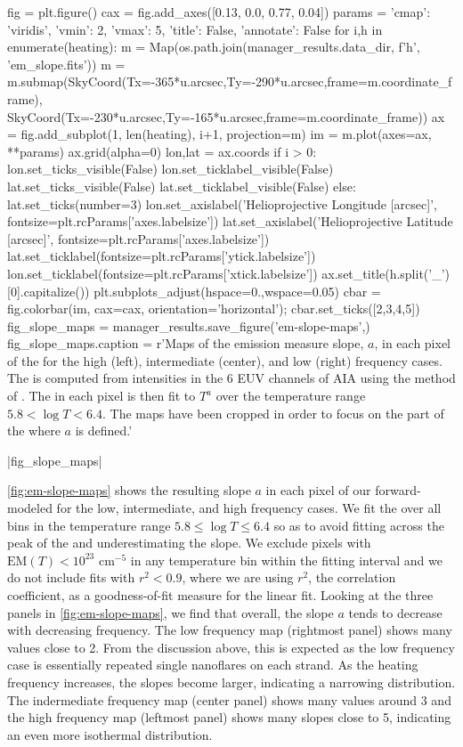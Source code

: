 \begin{pycode}
fig = plt.figure()
cax = fig.add_axes([0.13, 0.0, 0.77, 0.04])
params = {'cmap': 'viridis', 'vmin': 2, 'vmax': 5, 'title': False, 'annotate': False}
for i,h in enumerate(heating):
    m = Map(os.path.join(manager_results.data_dir, f'{h}', 'em_slope.fits'))
    m = m.submap(SkyCoord(Tx=-365*u.arcsec,Ty=-290*u.arcsec,frame=m.coordinate_frame),
                 SkyCoord(Tx=-230*u.arcsec,Ty=-165*u.arcsec,frame=m.coordinate_frame))
    ax = fig.add_subplot(1, len(heating), i+1, projection=m)
    im = m.plot(axes=ax, **params)
    ax.grid(alpha=0)
    lon,lat = ax.coords
    if i > 0:
        lon.set_ticks_visible(False)
        lon.set_ticklabel_visible(False)
        lat.set_ticks_visible(False)
        lat.set_ticklabel_visible(False)
    else:
        lat.set_ticks(number=3)
        lon.set_axislabel('Helioprojective Longitude [arcsec]',
                          fontsize=plt.rcParams['axes.labelsize'])
        lat.set_axislabel('Helioprojective Latitude [arcsec]',
                          fontsize=plt.rcParams['axes.labelsize'])
        lat.set_ticklabel(fontsize=plt.rcParams['ytick.labelsize'])
        lon.set_ticklabel(fontsize=plt.rcParams['xtick.labelsize'])
    ax.set_title(h.split('_')[0].capitalize())
plt.subplots_adjust(hspace=0.,wspace=0.05)
cbar = fig.colorbar(im, cax=cax, orientation='horizontal');
cbar.set_ticks([2,3,4,5])
fig_slope_maps = manager_results.save_figure('em-slope-maps',)
fig_slope_maps.caption = r'Maps of the emission measure slope, $a$, in each pixel of the \AR{} for the high (left), intermediate (center), and low (right) frequency cases. The \dem{} is computed from intensities in the 6 EUV channels of AIA using the method of \citet{hannah_differential_2012}. The \dem{} in each pixel is then fit to $T^a$ over the temperature range $5.8<\log{T}<6.4$. The maps have been cropped in order to focus on the part of the \AR{} where $a$ is defined.'  
\end{pycode}
|fig_slope_maps|

\autoref{fig:em-slope-maps} shows the resulting \dem{} slope $a$ in each pixel of our forward-modeled \AR{} for the low, intermediate, and high frequency cases. We fit the \dem{} over all bins in the temperature range $5.8\le\log T\le6.4$ so as to avoid fitting across the peak of the \dem{} and underestimating the slope. We exclude pixels with $\mathrm{EM}(T)<10^{23}$ cm$^{-5}$ in any temperature bin within the fitting interval and we do not include fits with $r^2<0.9$, where we are using $r^2$, the correlation coefficient, as a goodness-of-fit measure for the linear fit. Looking at the three panels in \autoref{fig:em-slope-maps}, we find that overall, the \dem{} slope $a$ tends to decrease with decreasing frequency. The low frequency map (rightmost panel) shows many values close to 2. From the discussion above, this is expected as the low frequency case is essentially repeated single nanoflares on each strand. As the heating frequency increases, the slopes become larger, indicating a narrowing \dem{} distribution. The indermediate frequency map (center panel) shows many values around 3 and the high frequency map (leftmost panel) shows many slopes close to 5, indicating an even more isothermal distribution. 

